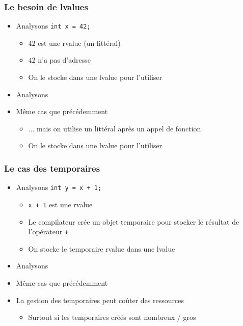 \begin{frame}
\frametitle{Le besoin de lvalues}
\begin{itemize}
 \item Analysons \lstinline|int x = 42;|
	\begin{itemize}
	 \item $42$ est une rvalue (un littéral)
	\onslide<3-> \item $42$ n'a pas d'adresse
	\onslide<4-> \item On le stocke dans une lvalue pour l'utiliser
	\end{itemize}
 \item Analysons 
\end{itemize}
\centering{}
\begin{itemize}
 \item Même cas que précédemment
	\begin{itemize}
	 \item ... mais on utilise un littéral après un appel de fonction
	\onslide<8-> \item On le stocke dans une lvalue pour l'utiliser
	\end{itemize}
\end{itemize}
\end{frame}

\begin{frame}
\frametitle{Le cas des temporaires}
\begin{itemize}
 \item Analysons \lstinline|int y = x + 1;|
	\begin{itemize}
	 \item \texttt{x + 1} est une rvalue
	\onslide<3-> \item Le compilateur crée un objet temporaire pour stocker le résultat de l'opérateur \texttt{+}
	\onslide<4-> \item On stocke le temporaire rvalue dans une lvalue
	\end{itemize}
 \item Analysons
\end{itemize}
\centering{}
\begin{itemize}
 \item Même cas que précédemment
 \item La gestion des temporaires peut coûter des ressources
	\begin{itemize}
	 \item Surtout si les temporaires créés sont nombreux / gros
	\end{itemize}
\end{itemize}
\end{frame}

